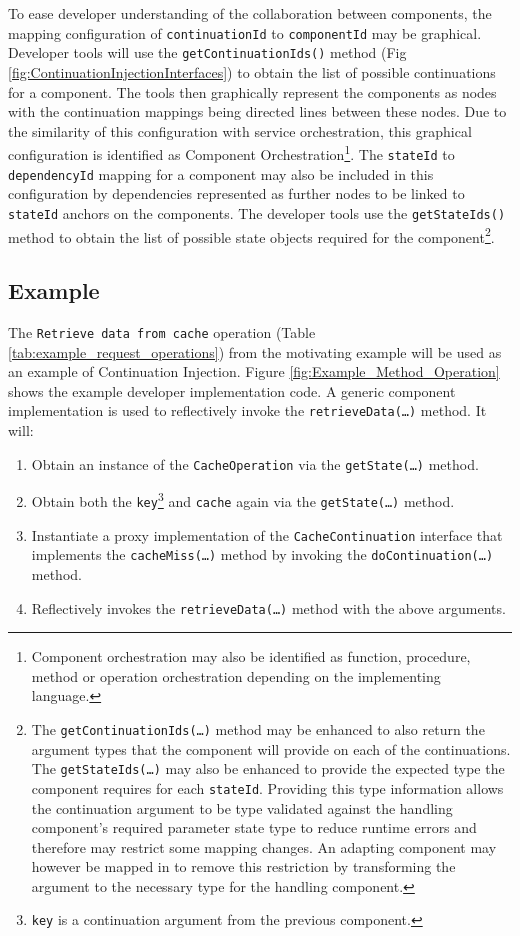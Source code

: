\documentclass[prodmode]{style/acmlarge}
\begin{document}
To ease developer understanding of the collaboration between components, the
mapping configuration of \texttt{continuationId}  to \texttt{componentId} may be
graphical.  Developer tools will use the \texttt{getContinuationIds()} method
(Fig \ref{fig:ContinuationInjectionInterfaces}) to obtain the list of possible
continuations for a component.  The tools then graphically represent the
components as nodes with the continuation mappings being directed lines between
these nodes.  Due to the similarity of this configuration with service
orchestration, this graphical configuration is identified as Component
Orchestration\footnote{Component orchestration may also be identified as
function, procedure, method or operation orchestration depending on the
implementing language.}.  The \texttt{stateId} to \texttt{dependencyId} mapping
for a component may also be included in this configuration by dependencies
represented as further nodes to be linked to \texttt{stateId} anchors on the
components.  The developer tools use the \texttt{getStateIds()} method to
obtain the list of possible state objects required for the
component\footnote{The \texttt{getContinuationIds(\ldots)} method may be
enhanced to also return the argument types that the component will provide on
each of the continuations.  The \texttt{getStateIds(\ldots)} may also be
enhanced to provide the expected type the component requires for each
\texttt{stateId}.  Providing this type information allows the continuation
argument to be type validated against the handling component's required
parameter state type to reduce runtime errors and therefore may restrict some
mapping changes.  An adapting component may however be mapped in to remove this
restriction by transforming the argument to the necessary type for the handling
component.}.


\subsection{Example}

The \texttt{Retrieve data from cache} operation (Table
\ref{tab:example_request_operations}) from the motivating example will be used
as an example of Continuation Injection.  Figure
\ref{fig:Example_Method_Operation} shows the example developer implementation
code.  A generic component implementation is used to reflectively invoke the
\texttt{retrieveData(\ldots)} method. It will:
\begin{enumerate}
  \item Obtain an instance of the \texttt{CacheOperation} via the \texttt{getState(\ldots)} method.
  \item Obtain both the \texttt{key}\footnote{\texttt{key} is a continuation argument from the previous component.} and \texttt{cache} again via the \texttt{getState(\ldots)} method.
  \item Instantiate a proxy implementation of the \texttt{CacheContinuation} interface that implements the \texttt{cacheMiss(\ldots)} method by invoking the \texttt{doContinuation(\ldots)} method. 
  \item Reflectively invokes the \texttt{retrieveData(\ldots)} method with the above arguments.
\end{enumerate}
\end{document}

